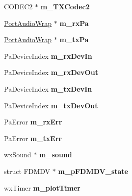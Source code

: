 \begin{DoxyCompactItemize}
\item 
\hypertarget{class_main_frame_afaba7062c501caac37727f56e5544cd0}{C\-O\-D\-E\-C2 $\ast$ {\bfseries m\-\_\-\-T\-X\-Codec2}}\label{class_main_frame_afaba7062c501caac37727f56e5544cd0}

\item 
\hypertarget{class_main_frame_abe7ab65d044b37b6973ed849bcd2759b}{\hyperlink{class_port_audio_wrap}{Port\-Audio\-Wrap} $\ast$ {\bfseries m\-\_\-rx\-Pa}}\label{class_main_frame_abe7ab65d044b37b6973ed849bcd2759b}

\item 
\hypertarget{class_main_frame_a2bedcb7f813060b8fb918ec315496f17}{\hyperlink{class_port_audio_wrap}{Port\-Audio\-Wrap} $\ast$ {\bfseries m\-\_\-tx\-Pa}}\label{class_main_frame_a2bedcb7f813060b8fb918ec315496f17}

\item 
\hypertarget{class_main_frame_ab9d54920598f48bdbfa67161b3167b11}{Pa\-Device\-Index {\bfseries m\-\_\-rx\-Dev\-In}}\label{class_main_frame_ab9d54920598f48bdbfa67161b3167b11}

\item 
\hypertarget{class_main_frame_aa73d0adbbf4fe9f2d14778ad1474a3d3}{Pa\-Device\-Index {\bfseries m\-\_\-rx\-Dev\-Out}}\label{class_main_frame_aa73d0adbbf4fe9f2d14778ad1474a3d3}

\item 
\hypertarget{class_main_frame_a5d89367413fe47a5d82b6aa7c7827746}{Pa\-Device\-Index {\bfseries m\-\_\-tx\-Dev\-In}}\label{class_main_frame_a5d89367413fe47a5d82b6aa7c7827746}

\item 
\hypertarget{class_main_frame_aac31ac35a3c5bb4847e94501f18f3eab}{Pa\-Device\-Index {\bfseries m\-\_\-tx\-Dev\-Out}}\label{class_main_frame_aac31ac35a3c5bb4847e94501f18f3eab}

\item 
\hypertarget{class_main_frame_a9410cdbd4251567ae01c77d8e7bd505b}{Pa\-Error {\bfseries m\-\_\-rx\-Err}}\label{class_main_frame_a9410cdbd4251567ae01c77d8e7bd505b}

\item 
\hypertarget{class_main_frame_a9af2231b1aac90f8c6abdede80eb0911}{Pa\-Error {\bfseries m\-\_\-tx\-Err}}\label{class_main_frame_a9af2231b1aac90f8c6abdede80eb0911}

\item 
\hypertarget{class_main_frame_a6458de14647c34b3ae5ace81992710d6}{wx\-Sound $\ast$ {\bfseries m\-\_\-sound}}\label{class_main_frame_a6458de14647c34b3ae5ace81992710d6}

\item 
\hypertarget{class_main_frame_aae86bcc3a14e94ddc496b9cce6a63c56}{struct F\-D\-M\-D\-V $\ast$ {\bfseries m\-\_\-p\-F\-D\-M\-D\-V\-\_\-state}}\label{class_main_frame_aae86bcc3a14e94ddc496b9cce6a63c56}

\item 
\hypertarget{class_main_frame_aabe58bef730ca69b342f8ac663c3d70d}{wx\-Timer {\bfseries m\-\_\-plot\-Timer}}\label{class_main_frame_aabe58bef730ca69b342f8ac663c3d70d}

\end{DoxyCompactItemize}
